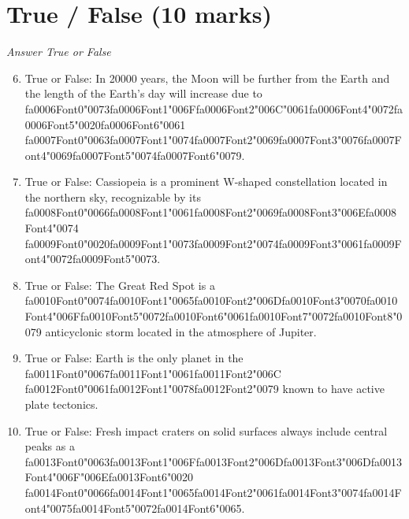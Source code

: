 \documentclass[12pt]{article}
\begin{document}
\section*{True / False (10 marks)}
\textit{Answer True or False}
\begin{enumerate}[label=\arabic*.]
\setcounter{enumi}{5}
\item True or False: In 20000 years, the Moon will be further from the Earth and the length of the Earth's day will increase due to {\csname fa0006Font0\endcsname\char"0073}{\csname fa0006Font1\endcsname\char"006F}{\csname fa0006Font2\endcsname\char"006C}{\char"0061}{\csname fa0006Font4\endcsname\char"0072}{\csname fa0006Font5\endcsname\char"0020}{\csname fa0006Font6\endcsname\char"0061} {\csname fa0007Font0\endcsname\char"0063}{\csname fa0007Font1\endcsname\char"0074}{\csname fa0007Font2\endcsname\char"0069}{\csname fa0007Font3\endcsname\char"0076}{\csname fa0007Font4\endcsname\char"0069}{\csname fa0007Font5\endcsname\char"0074}{\csname fa0007Font6\endcsname\char"0079}.
\item True or False: Cassiopeia is a prominent W-shaped constellation located in the northern sky, recognizable by its {\csname fa0008Font0\endcsname\char"0066}{\csname fa0008Font1\endcsname\char"0061}{\csname fa0008Font2\endcsname\char"0069}{\csname fa0008Font3\endcsname\char"006E}{\csname fa0008Font4\endcsname\char"0074} {\csname fa0009Font0\endcsname\char"0020}{\csname fa0009Font1\endcsname\char"0073}{\csname fa0009Font2\endcsname\char"0074}{\csname fa0009Font3\endcsname\char"0061}{\csname fa0009Font4\endcsname\char"0072}{\csname fa0009Font5\endcsname\char"0073}.
\item True or False: The Great Red Spot is a {\csname fa0010Font0\endcsname\char"0074}{\csname fa0010Font1\endcsname\char"0065}{\csname fa0010Font2\endcsname\char"006D}{\csname fa0010Font3\endcsname\char"0070}{\csname fa0010Font4\endcsname\char"006F}{\csname fa0010Font5\endcsname\char"0072}{\csname fa0010Font6\endcsname\char"0061}{\csname fa0010Font7\endcsname\char"0072}{\csname fa0010Font8\endcsname\char"0079} anticyclonic storm located in the atmosphere of Jupiter.
\item True or False: Earth is the only planet in the {\csname fa0011Font0\endcsname\char"0067}{\csname fa0011Font1\endcsname\char"0061}{\csname fa0011Font2\endcsname\char"006C} {\csname fa0012Font0\endcsname\char"0061}{\csname fa0012Font1\endcsname\char"0078}{\csname fa0012Font2\endcsname\char"0079} known to have active plate tectonics.
\item True or False: Fresh impact craters on solid surfaces always include central peaks as a {\csname fa0013Font0\endcsname\char"0063}{\csname fa0013Font1\endcsname\char"006F}{\csname fa0013Font2\endcsname\char"006D}{\csname fa0013Font3\endcsname\char"006D}{\csname fa0013Font4\endcsname\char"006F}{\char"006E}{\csname fa0013Font6\endcsname\char"0020} {\csname fa0014Font0\endcsname\char"0066}{\csname fa0014Font1\endcsname\char"0065}{\csname fa0014Font2\endcsname\char"0061}{\csname fa0014Font3\endcsname\char"0074}{\csname fa0014Font4\endcsname\char"0075}{\csname fa0014Font5\endcsname\char"0072}{\csname fa0014Font6\endcsname\char"0065}.
\end{enumerate}
\end{document}
